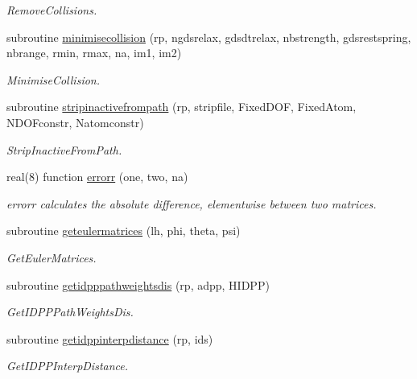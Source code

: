 \begin{DoxyCompactItemize}
\begin{DoxyCompactList}\small\item\em Remove\+Collisions. \end{DoxyCompactList}\item 
subroutine \mbox{\hyperlink{namespacerpath_a75785c13dc36360c86c2ef8e8dd11fad}{minimisecollision}} (rp, ngdsrelax, gdsdtrelax, nbstrength, gdsrestspring, nbrange, rmin, rmax, na, im1, im2)
\begin{DoxyCompactList}\small\item\em Minimise\+Collision. \end{DoxyCompactList}\item 
subroutine \mbox{\hyperlink{namespacerpath_aa844bacf78aac643d982ebb18988dbb6}{stripinactivefrompath}} (rp, stripfile, Fixed\+D\+OF, Fixed\+Atom, N\+D\+O\+Fconstr, Natomconstr)
\begin{DoxyCompactList}\small\item\em Strip\+Inactive\+From\+Path. \end{DoxyCompactList}\item 
real(8) function \mbox{\hyperlink{namespacerpath_a4c7410e4e6417ef235293315107537e8}{errorr}} (one, two, na)
\begin{DoxyCompactList}\small\item\em errorr calculates the absolute difference, elementwise between two matrices. \end{DoxyCompactList}\item 
subroutine \mbox{\hyperlink{namespacerpath_a37439f39e5934c023cbc1ce46a641de9}{geteulermatrices}} (lh, phi, theta, psi)
\begin{DoxyCompactList}\small\item\em Get\+Euler\+Matrices. \end{DoxyCompactList}\item 
subroutine \mbox{\hyperlink{namespacerpath_a57a80823cabeccdde83680731d65d88e}{getidpppathweightsdis}} (rp, adpp, H\+I\+D\+PP)
\begin{DoxyCompactList}\small\item\em Get\+I\+D\+P\+P\+Path\+Weights\+Dis. \end{DoxyCompactList}\item 
subroutine \mbox{\hyperlink{namespacerpath_a40c08338c270399cecf65a4f2e6b858d}{getidppinterpdistance}} (rp, ids)
\begin{DoxyCompactList}\small\item\em Get\+I\+D\+P\+P\+Interp\+Distance. \end{DoxyCompactList}\item 

\end{DoxyCompactItemize}

